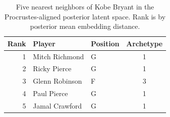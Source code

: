 \begin{table}[htbp]
  \centering\small
  \begin{tabular}{rllc}
    \toprule
    Rank & Player & Position & Archetype \\
    \midrule
    1 & Mitch Richmond & G & 1 \\
    2 & Ricky Pierce & G & 1 \\
    3 & Glenn Robinson & F & 3 \\
    4 & Paul Pierce & G & 1 \\
    5 & Jamal Crawford & G & 1 \\
    \bottomrule
  \end{tabular}
  \caption{Five nearest neighbors of Kobe Bryant in the Procrustes-aligned posterior latent space. Rank is by posterior mean embedding distance.}
  \label{tab:Kobe_Bryant_neighbors}
\end{table}

